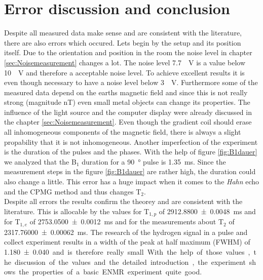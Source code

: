 \section{Error discussion and conclusion}
\label{sec:Fazit}
Despite all measured data make sense and are consistent with the literature, there are also errors which occured. Lets begin by the setup and its position itself. Due to the orientation and position in the room the noise level in chapter \ref{sec:Noisemeasurement} changes a lot. The noise level \SI{7.7}{\mu \volt} is a value below \SI{10}{\mu \volt} and therefore a acceptable noise level. To achieve excellent results it is even though necessary to have a noise level below \SI{3}{\mu \volt}. Furthermore some of the measured data depend on the earths magnetic field and since this is not really strong (magnitude \si{\nano \tesla}) even small metal objects can change its properties. The influence of the light source and the computer display were already discussed in the chapter \ref{sec:Noisemeasurement}. Even though the gradient coil should erase all inhomogeneous components of the magnetic field, there is always a slight propability that it is not inhomogeneous.\newline
Another imperfection of the experiment is the duration of the pulses and the phases. With the help of figure \ref{fig:B1dauer} we analyzed that the B$_1$ duration for a \SI{90}{\degree} pulse is \SI{1.35}{\milli \second}. Since the measurement steps in the figure \ref{fig:B1dauer} are rather high, the duration could also change a little. This error has a huge impact when it comes to the \textit{Hahn} echo and the CPMG method and thus changes T$_2$.
\\
Despite all errors the results confirm the theorey and are consistent with the literature. This is allocable by the values for T$_{1,p}$ of \SI{2912.8800 \pm 0.0048}{\milli \second} and for T$_{1,e}$ of \SI{2753.0500 \pm 0.0012}{\milli \second} and for the measurements about T$_2$ of \SI{2317.76000 \pm 0.00062}{\milli \second}. The research of the hydrogen signal in a pulse and collect experiment results in a width of the peak at half maximum (FWHM) of \SI{1.180 \pm 0.040} and is therefore really small. With the help of those values, the discussion of the values and the detailed introduction, the experiment shows the properties of a basic ENMR experiment quite good.